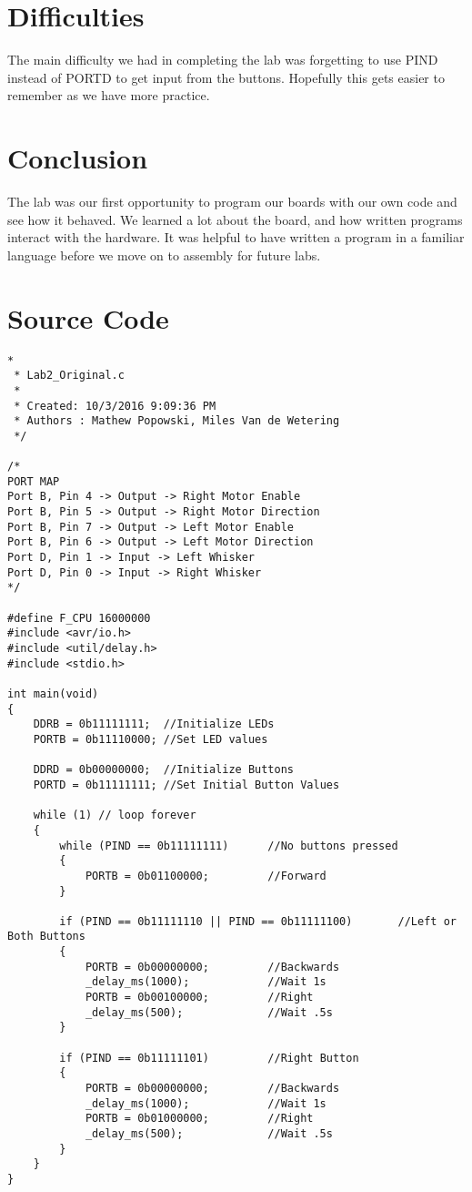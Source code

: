 \documentclass[12pt,letterpaper]{article}
\begin{document}
\section{Difficulties}
The main difficulty we had in completing the lab was forgetting to use PIND instead of PORTD to get input from the buttons. Hopefully this gets easier to remember as we have more practice.

\section{Conclusion}
The lab was our first opportunity to program our boards with our own code and see how it behaved. We learned a lot about the board, and how written programs interact with the hardware. It was helpful to have written a program in a familiar language before we move on to assembly for future labs.

\section{Source Code}
\begin{verbatim}
*
 * Lab2_Original.c
 *
 * Created: 10/3/2016 9:09:36 PM
 * Authors : Mathew Popowski, Miles Van de Wetering
 */

/*
PORT MAP
Port B, Pin 4 -> Output -> Right Motor Enable
Port B, Pin 5 -> Output -> Right Motor Direction
Port B, Pin 7 -> Output -> Left Motor Enable
Port B, Pin 6 -> Output -> Left Motor Direction
Port D, Pin 1 -> Input -> Left Whisker
Port D, Pin 0 -> Input -> Right Whisker
*/

#define F_CPU 16000000
#include <avr/io.h>
#include <util/delay.h>
#include <stdio.h>

int main(void)
{
	DDRB = 0b11111111;	//Initialize LEDs
	PORTB = 0b11110000; //Set LED values

	DDRD = 0b00000000;	//Initialize Buttons
	PORTD = 0b11111111;	//Set Initial Button Values

	while (1) // loop forever
	{
		while (PIND == 0b11111111)		//No buttons pressed
		{
			PORTB = 0b01100000;			//Forward
		}

		if (PIND == 0b11111110 || PIND == 0b11111100)		//Left or Both Buttons
		{
			PORTB = 0b00000000;			//Backwards
			_delay_ms(1000);			//Wait 1s
			PORTB = 0b00100000;			//Right
			_delay_ms(500);				//Wait .5s
		}

		if (PIND == 0b11111101)			//Right Button
		{
			PORTB = 0b00000000;			//Backwards
			_delay_ms(1000);			//Wait 1s
			PORTB = 0b01000000;			//Right
			_delay_ms(500);				//Wait .5s
		}
	}
}
\end{verbatim}
\end{document}
